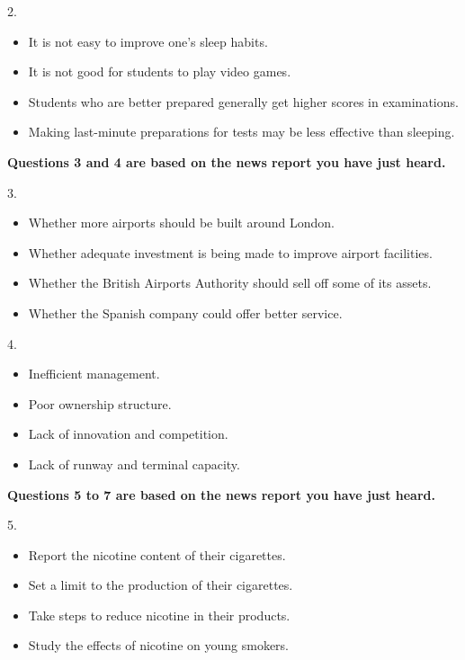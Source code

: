 \documentclass[UTF8,11pt]{ctexart}
\begin{document}
2.


\begin{itemize}[leftmargin=2em,itemsep=.2em,topsep=.4em]\item[A.] It is not easy to improve one’s sleep habits.
\item[B.] It is not good for students to play video games.
\item[C.] Students who are better prepared generally get higher scores in examinations.
\item[D.] Making last-minute preparations for tests may be less effective than sleeping.
\end{itemize}

\textbf{Questions 3 and 4 are based on the news report you have just heard.}


3.


\begin{itemize}[leftmargin=2em,itemsep=.2em,topsep=.4em]\item[A.] Whether more airports should be built around London.
\item[B.] Whether adequate investment is being made to improve airport facilities.
\item[C.] Whether the British Airports Authority should sell off some of its assets.
\item[D.] Whether the Spanish company could offer better service.
\end{itemize}

4.


\begin{itemize}[leftmargin=2em,itemsep=.2em,topsep=.4em]\item[A.] Inefficient management.
\item[B.] Poor ownership structure.
\item[C.] Lack of innovation and competition.
\item[D.] Lack of runway and terminal capacity.
\end{itemize}

\textbf{Questions 5 to 7 are based on the news report you have just heard.}


5.


\begin{itemize}[leftmargin=2em,itemsep=.2em,topsep=.4em]\item[A.] Report the nicotine content of their cigarettes.
\item[B.] Set a limit to the production of their cigarettes.
\item[C.] Take steps to reduce nicotine in their products.
\item[D.] Study the effects of nicotine on young smokers.
\end{itemize}
\end{document}
